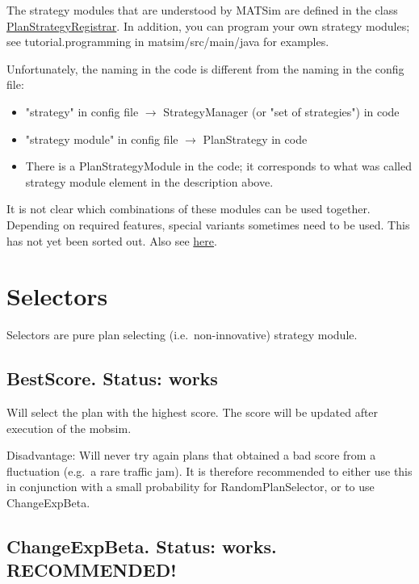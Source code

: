 The strategy modules that are understood by MATSim are defined in the class \href{http://www.matsim.org/xref/org/matsim/core/controler/PlanStrategyRegistrar.html}{PlanStrategyRegistrar}. In addition, you can program your own strategy modules; see tutorial.programming in matsim/src/main/java for examples.

Unfortunately, the naming in the code is different from the naming in the config file:
\begin{itemize}
	\item "strategy" in config file $\rightarrow$ StrategyManager (or "set of strategies") in code
	\item "strategy module" in config file $\rightarrow$ PlanStrategy in code
	\item There is a PlanStrategyModule in the code; it corresponds to what was called strategy module element in the description above.
\end{itemize}

It is not clear which combinations of these modules can be used  together. Depending on required features, special variants sometimes  need to be used. This has not yet been sorted out. Also see \href{http://matsim.org/node/690}{here}.


\umbruch

\section{Selectors}
\label{sec:selectors}

Selectors are pure plan selecting (i.e.\ non-innovative) strategy module.

\subsection{BestScore.  Status: works}

Will select the plan with the highest score. The score will be updated after execution of the mobsim.

Disadvantage: Will never try again plans that obtained a bad score  from a fluctuation (e.g.\ a rare traffic jam). It is therefore  recommended to either use this in conjunction with a small probability  for RandomPlanSelector, or to use ChangeExpBeta.

\subsection{ChangeExpBeta. Status: works. RECOMMENDED!}

